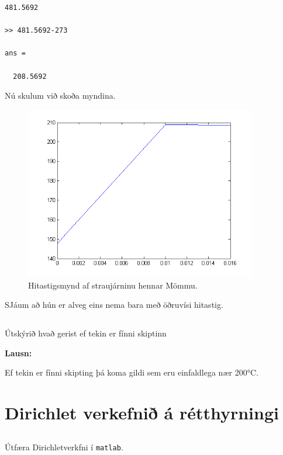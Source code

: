 \documentclass[11pt,a4paper,titlepage]{article}
\begin{document}
\begin{verbatim}
481.5692

>> 481.5692-273

ans =

  208.5692
\end{verbatim}

Nú skulum við skoða myndina. 
 \begin{figure}[h!]
      \centering
      \includegraphics[width=0.9\textwidth]{2_2_e_0.png}
      \caption{Hitastigsmynd af straujárninu hennar Mömmu.}
      \label{fig:awesome_image4}
  \end{figure}
  SJáum að hún er alveg eins nema bara með öðruvísi hitastig. 


\subsection{}
Útskýrið hvað gerist ef tekin er fínni skiptinn

\textbf{Lausn:}

Ef tekin er fínni skipting þá koma gildi sem eru einfaldlega nær 200°C.  


\section{Dirichlet verkefnið á rétthyrningi}

\subsection{}

Útfæra Dirichletverkfni í  \verb|matlab|. 
\end{document}
